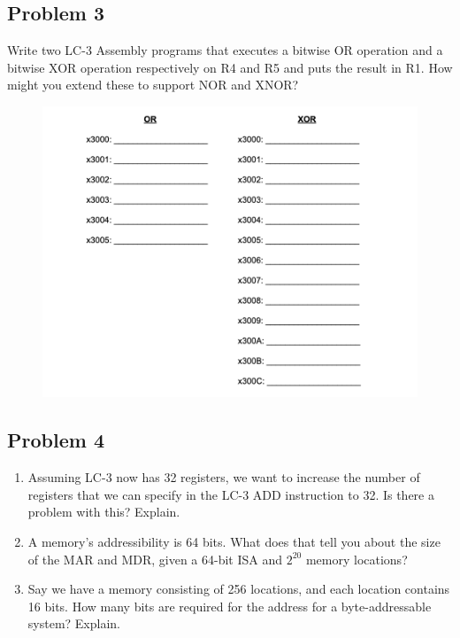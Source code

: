 \documentclass{article}
\begin{document}
\subsection*{Problem 3}
Write two LC-3 Assembly programs that executes a bitwise OR operation and a bitwise XOR operation respectively on R4 and R5 and puts the result in R1. How might you extend these to support NOR and XNOR?
\begin{figure}[!h]
    \centering
    \includegraphics[width=1\textwidth]{figures/lc3_q4.png}
\end{figure}

\newpage
\subsection*{Problem 4}
\begin{enumerate}[label=\alph*.]
\item Assuming LC-3 now has 32 registers, we want to increase the number of registers that we can specify in the LC-3 ADD instruction to 32. Is there a problem with this? Explain.
\item A memory's addressibility is 64 bits. What does that tell you about the size of the MAR and MDR, given a 64-bit ISA and $2^{20}$ memory locations?
\item Say we have a memory consisting of 256 locations, and each location contains 16 bits. How many bits are required for the address for a byte-addressable system? Explain.
\end{enumerate}
\end{document}
